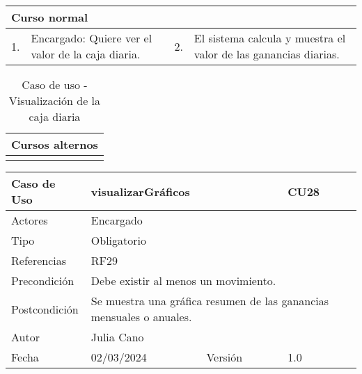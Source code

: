 \begin{table}[H]
	\centering
	\begin{tabular}{| m{} | m{} | m{} | m{} |}
		\hline
		\multicolumn{4}{|m{0.9\textwidth}|}{Curso normal}     \\ 
		\hline
		1. & Encargado: Quiere ver el valor de la caja diaria. & 2. & El sistema calcula y muestra el valor de las ganancias diarias.  \\ 
		\hline
	\end{tabular}
\end{table}

\begin{table}[H]
	\centering
	\begin{tabular}{| m{} | m{} | m{} | m{} |}
		\hline
		\multicolumn{4}{|m{0.9\textwidth}|}{Cursos alternos}     \\ 
		\hline
		& \multicolumn{3}{m{0.67\textwidth}|}{} \\ 
		\hline
	\end{tabular}
	\caption{Caso de uso - Visualización de la caja diaria}
\end{table}

\newpage


\begin{table}[H]
	\centering
	\begin{tabular}{| m{} | m{} | m{} | m{}|}
		\hline
		\rowcolor{grayshade} Caso de Uso & \multicolumn{2}{|m{0.43\textwidth}|}{visualizarGráficos} &  CU28\\ 
		\hline
		Actores & \multicolumn{3}{l|}{Encargado} \\ 
		\hline
		Tipo & \multicolumn{3}{l|}{Obligatorio} \\ 
		\hline
		Referencias & \multicolumn{3}{l|}{RF29} \\ 
		\hline
		Precondición & \multicolumn{3}{m{0.67\textwidth}|}{Debe existir al menos un movimiento.} \\ 
		\hline
		Postcondición & \multicolumn{3}{m{0.67\textwidth}|}{Se muestra una gráfica resumen de las ganancias mensuales o anuales.} \\ 
		\hline
		Autor & \multicolumn{3}{l|}{Julia Cano} \\ 
		\hline
		Fecha & 02/03/2024 & Versión & 1.0 \\
		\hline
	\end{tabular}
\end{table}

